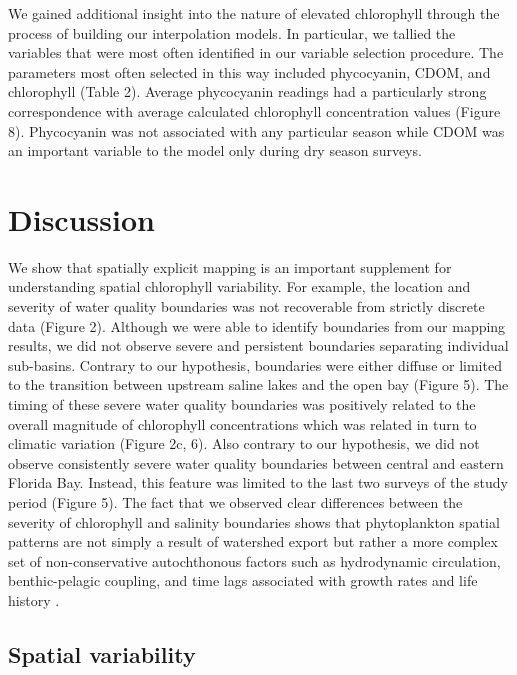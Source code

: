 We gained additional insight into the nature of elevated chlorophyll through the process of building our interpolation models. In particular, we tallied the variables that were most often identified in our variable selection procedure. The parameters most often selected in this way included phycocyanin, CDOM, and chlorophyll (Table 2). Average phycocyanin readings had a particularly strong correspondence with average calculated chlorophyll concentration values (Figure 8). Phycocyanin was not associated with any particular season while CDOM was an important variable to the model only during dry season surveys.

\section{Discussion}
\label{discussion}

We show that spatially explicit mapping is an important supplement for understanding spatial chlorophyll variability. For example, the location and severity of water quality boundaries was not recoverable from strictly discrete data (Figure 2). Although we were able to identify boundaries from our mapping results, we did not observe severe and persistent boundaries separating individual sub-basins. Contrary to our hypothesis, boundaries were either diffuse or limited to the transition between upstream saline lakes and the open bay (Figure 5). The timing of these severe water quality boundaries was positively related to the overall magnitude of chlorophyll concentrations which was related in turn to climatic variation (Figure 2c, 6). Also contrary to our hypothesis, we did not observe consistently severe water quality boundaries between central and eastern Florida Bay. Instead, this feature was limited to the last two surveys of the study period (Figure 5). The fact that we observed clear differences between the severity of chlorophyll and salinity boundaries shows that phytoplankton spatial patterns are not simply a result of watershed export but rather a more complex set of non-conservative autochthonous factors such as hydrodynamic circulation, benthic-pelagic coupling, and time lags associated with growth rates and life history \citep[Figure 6, ][]{zhang_2014, lawrence2004wind}. 

\subsection{Spatial variability}
\label{spatialvariability}

